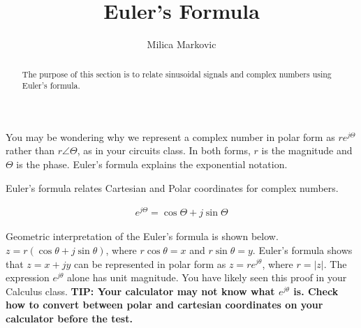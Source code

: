 \documentclass{ximera}
\title{Euler's Formula}
\author{Milica Markovic}
\begin{document}
  
\begin{abstract}  
The purpose of this section is to relate sinusoidal signals and complex numbers using Euler's formula.
\end{abstract}  
\maketitle    
  



You may be wondering why we represent a complex number in
polar form as $r e^{j\Theta}$ rather than $r\angle\Theta$,
as in your circuits class. In both forms, $r$ is the magnitude
and $\Theta$ is the phase. Euler's formula explains the
exponential notation.

  
  

 Euler's formula relates Cartesian and Polar coordinates for complex numbers.

\begin{eqnarray}
 e^{j \Theta} =  \cos \Theta + j  \sin \Theta
\end{eqnarray}

Geometric interpretation of the Euler's formula is shown below. $z=r ( \cos{\theta} + j \sin{\theta})$, where $r \cos{\theta}=x$ and $r \sin{\theta}=y$. Euler's formula shows that $z=x+jy$ can be represented
in polar form as $z=r e^{j\theta}$, where $r=|z|$.
The expression $e^{j\theta}$ alone has unit magnitude.
You have likely seen this proof in your Calculus class.  {\bf TIP: Your calculator may not know what $e^{j\theta}$ is. Check how to convert between polar and cartesian coordinates on your calculator before the test.}
\end{document}
